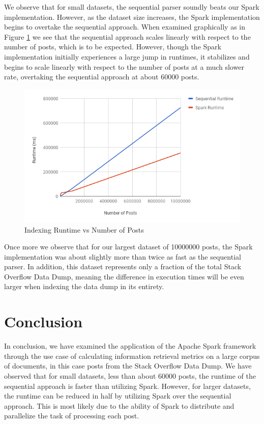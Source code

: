 \documentclass[conference]{IEEEtran}
\newcommand{\so}{Stack Overflow\xspace}
\begin{document}
We observe that for small datasets, the sequential parser soundly beats our Spark implementation. However, as the dataset size increases, the Spark implementation begins to overtake the sequential approach.  When examined graphically as in Figure \ref{fig:graph} we see that the sequential approach scales linearly with respect to the number of posts, which is to be expected. However, though the Spark implementation initially experiences a large jump in runtimes, it stabilizes and begins to scale linearly with respect to the number of posts at a much slower rate, overtaking the sequential approach at about 60000 posts.

\begin{figure}[ht]
	\caption{Indexing Runtime vs Number of Posts}
	\label{fig:graph}
	\includegraphics[width=\linewidth]{chart.png}
\end{figure}

Once more we observe that for our largest dataset of 10000000 posts, the Spark implementation was about slightly more than twice as fast as the sequential parser.  In addition, this dataset represents only a fraction of the total \so Data Dump, meaning the difference in execution times will be even larger when indexing the data dump in its entirety.

\section{Conclusion}
In conclusion, we have examined the application of the Apache Spark framework through the use case of calculating information retrieval metrics on a large corpus of documents, in this case posts from the \so Data Dump.  We have observed that for small datasets, less than about 60000 posts, the runtime of the sequential approach is faster than utilizing Spark.  However, for larger datasets, the runtime can be reduced in half by utilizing Spark over the sequential approach.  This is most likely due to the ability of Spark to distribute and parallelize the task of processing each post.
	
\end{document}
